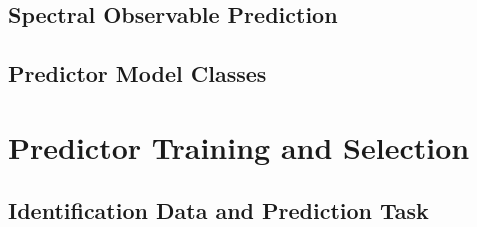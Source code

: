\subsection{Spectral Observable Prediction}

\subsection{Predictor Model Classes}

\section{Predictor Training and Selection}

\subsection{Identification Data and Prediction Task}

